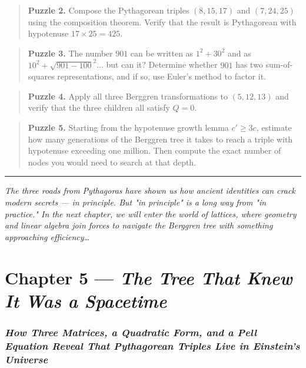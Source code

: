 \documentclass[12pt, letterpaper, openany]{book}
\theoremstyle{definition}
\theoremstyle{remark}
\begin{document}
\begin{quote}
\textbf{Puzzle 2.} Compose the Pythagorean triples $(8, 15, 17)$ and $(7, 24, 25)$ using the composition theorem. Verify that the result is Pythagorean with hypotenuse $17 \times 25 = 425$.
\end{quote}



\begin{quote}
\textbf{Puzzle 3.} The number $901$ can be written as $1^2 + 30^2$ and as $10^2 + \sqrt{901 - 100}^2$... but can it? Determine whether $901$ has two sum-of-squares representations, and if so, use Euler's method to factor it.
\end{quote}



\begin{quote}
\textbf{Puzzle 4.} Apply all three Berggren transformations to $(5, 12, 13)$ and verify that the three children all satisfy $Q = 0$.
\end{quote}



\begin{quote}
\textbf{Puzzle 5.} Starting from the hypotenuse growth lemma $c' \geq 3c$, estimate how many generations of the Berggren tree it takes to reach a triple with hypotenuse exceeding one million. Then compute the exact number of nodes you would need to search at that depth.
\end{quote}



\bigskip\noindent\rule{\textwidth}{0.4pt}\bigskip


\textit{The three roads from Pythagoras have shown us how ancient identities can crack modern secrets --- in principle. But "in principle" is a long way from "in practice." In the next chapter, we will enter the world of lattices, where geometry and linear algebra join forces to navigate the Berggren tree with something approaching efficiency{\ldots}}


\clearpage

\chapter{Chapter 5 --- \textit{The Tree That Knew It Was a Spacetime}}



\subsection*{\textit{How Three Matrices, a Quadratic Form, and a Pell Equation Reveal That Pythagorean Triples Live in Einstein's Universe}}
\end{document}
